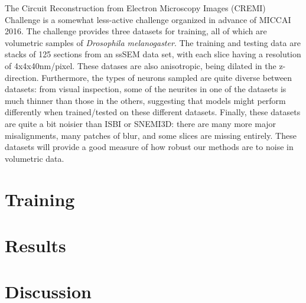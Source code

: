 The Circuit Reconstruction from Electron Microscopy Images (CREMI) Challenge is a somewhat less-active challenge organized in advance of MICCAI 2016\cite{Funke.Jan2016}. The challenge provides three datasets for training, all of which are volumetric samples of \textit{Drosophila melanogaster}. The training and testing data are stacks of 125 sections from an ssSEM data set, with each slice having a resolution of 4x4x40nm/pixel. These datases are also anisotropic, being dilated in the z-direction. Furthermore, the types of neurons sampled are quite diverse between datasets: from visual inspection, some of the neurites in one of the datasets is much thinner than those in the others, suggesting that models might perform differently when trained/tested on these different datasets. Finally, these datasets are quite a bit noisier than ISBI or SNEMI3D: there are many more major misalignments, many patches of blur, and some slices are missing entirely. These datasets will provide a good measure of how robust our methods are to noise in volumetric data. 

\section{Training}


\section{Results}

\section{Discussion}